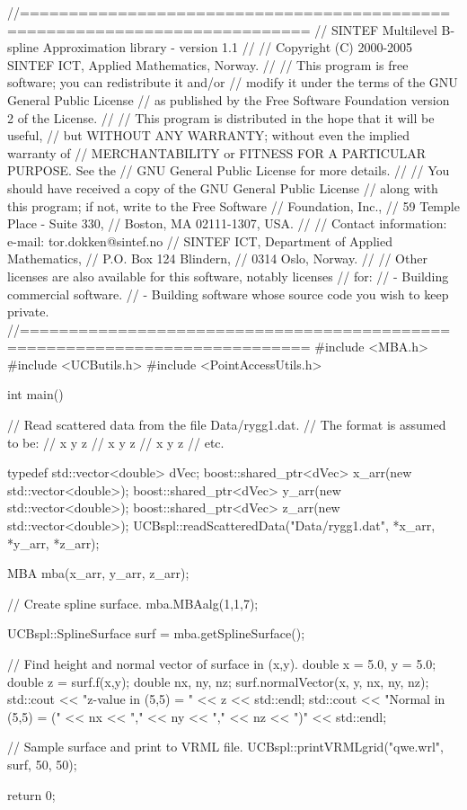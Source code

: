 
\begin{DoxyCodeInclude}
//===========================================================================
// SINTEF Multilevel B-spline Approximation library - version 1.1
//
// Copyright (C) 2000-2005 SINTEF ICT, Applied Mathematics, Norway.
//
// This program is free software; you can redistribute it and/or          
// modify it under the terms of the GNU General Public License            
// as published by the Free Software Foundation version 2 of the License. 
//
// This program is distributed in the hope that it will be useful,        
// but WITHOUT ANY WARRANTY; without even the implied warranty of         
// MERCHANTABILITY or FITNESS FOR A PARTICULAR PURPOSE.  See the          
// GNU General Public License for more details.                           
//
// You should have received a copy of the GNU General Public License      
// along with this program; if not, write to the Free Software            
// Foundation, Inc.,                                                      
// 59 Temple Place - Suite 330,                                           
// Boston, MA  02111-1307, USA.                                           
//
// Contact information: e-mail: tor.dokken@sintef.no                      
// SINTEF ICT, Department of Applied Mathematics,                         
// P.O. Box 124 Blindern,                                                 
// 0314 Oslo, Norway.                                                     
//
// Other licenses are also available for this software, notably licenses
// for:
// - Building commercial software.                                        
// - Building software whose source code you wish to keep private.        
//===========================================================================
#include <MBA.h>
#include <UCButils.h>
#include <PointAccessUtils.h>


int main() {

  // Read scattered data from the file Data/rygg1.dat.
  // The format is assumed to be:
  // x y z
  // x y z
  // x y z
  // etc.

  typedef std::vector<double> dVec;
  boost::shared_ptr<dVec> x_arr(new std::vector<double>);
  boost::shared_ptr<dVec> y_arr(new std::vector<double>);
  boost::shared_ptr<dVec> z_arr(new std::vector<double>);
  UCBspl::readScatteredData("Data/rygg1.dat", *x_arr, *y_arr, *z_arr);

  MBA mba(x_arr, y_arr, z_arr);

  // Create spline surface.
  mba.MBAalg(1,1,7);

  UCBspl::SplineSurface surf = mba.getSplineSurface();

  // Find height and normal vector of surface in (x,y).
  double x = 5.0, y = 5.0;
  double z = surf.f(x,y);         
  double nx, ny, nz;
  surf.normalVector(x, y, nx, ny, nz);
  std::cout << "z-value in (5,5) = " << z << std::endl;
  std::cout << "Normal in (5,5) = (" << nx << "," << ny << "," << nz << ")"
            << std::endl;

  // Sample surface and print to VRML file.
  UCBspl::printVRMLgrid("qwe.wrl", surf, 50, 50);  

  return 0;
}
\end{DoxyCodeInclude}
 